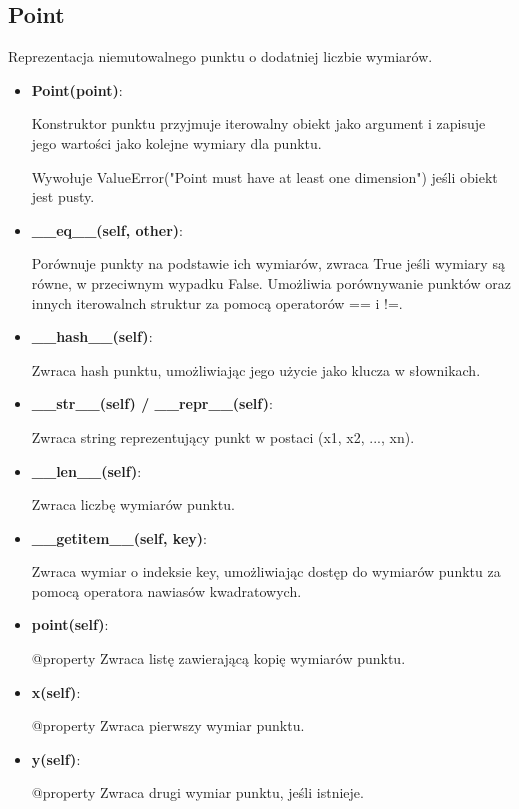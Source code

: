 \documentclass{lab}
\begin{document}
\subsection{Point}
Reprezentacja niemutowalnego punktu o dodatniej liczbie wymiarów.
\begin{itemize}
    \item \textbf{Point(point)}: 
    
    Konstruktor punktu przyjmuje iterowalny obiekt jako argument i zapisuje jego wartości jako kolejne wymiary dla punktu.
    
    Wywołuje ValueError("Point must have at least one dimension") jeśli obiekt jest pusty.
    \item \textbf{\_\_eq\_\_(self, other)}:
    
    Porównuje punkty na podstawie ich wymiarów, zwraca True jeśli wymiary są równe, w przeciwnym wypadku False. Umożliwia porównywanie punktów oraz innych iterowalnch struktur za pomocą operatorów == i !=.
    \item \textbf{\_\_hash\_\_(self)}:
    
    Zwraca hash punktu, umożliwiając jego użycie jako klucza w słownikach.

    \item \textbf{\_\_str\_\_(self) / \_\_repr\_\_(self)}:
    
    Zwraca string reprezentujący punkt w postaci (x1, x2, ..., xn).

    \item \textbf{\_\_len\_\_(self)}:
    
    Zwraca liczbę wymiarów punktu.

    \item \textbf{\_\_getitem\_\_(self, key)}:
    
    Zwraca wymiar o indeksie key, umożliwiając dostęp do wymiarów punktu za pomocą operatora nawiasów kwadratowych.

    \item \textbf{point(self)}:
    
    @property Zwraca listę zawierającą kopię wymiarów punktu.

    \item \textbf{x(self)}:
    
    @property Zwraca pierwszy wymiar punktu.

    \item \textbf{y(self)}:
    
    @property Zwraca drugi wymiar punktu, jeśli istnieje.


\end{itemize}
\end{document}
